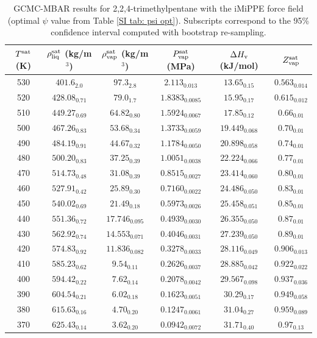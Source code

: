 \documentclass[journal=jctc,manuscript=article]{achemso}
\begin{document}
\begin{table}[htb!]
	\caption{GCMC-MBAR results for 2,2,4-trimethylpentane with the iMiPPE force field (optimal $\psi$ value from Table \ref{SI tab: psi opt}). Subscripts correspond to the 95\% confidence interval computed with bootstrap re-sampling.}
	\begin{center}
		\begin{tabular}{|c|c|c|c|c|c|}
			\hline
			$T^{\rm sat}$ (K) & $\rho_{\rm liq}^{\rm sat}$ (kg/m$^3$) & $\rho_{\rm vap}^{\rm sat}$ (kg/m$^3$) & $P_{\rm vap}^{\rm sat}$ (MPa) & $\Delta H_{\rm v}$ (kJ/mol) & $Z_{\rm vap}^{\rm sat}$ \\ \hline
			530 & $401.6_{2.0}$ & $97.3_{2.8}$ & $2.113_{0.013}$ & $13.65_{0.15}$ & $0.563_{0.014}$ \\
			520 & $428.08_{0.71}$ & $79.0_{1.7}$ & $1.8383_{0.0085}$ & $15.95_{0.17}$ & $0.615_{0.012}$ \\
			510 & $449.27_{0.69}$ & $64.82_{0.80}$ & $1.5924_{0.0067}$ & $17.85_{0.12}$ & $0.66_{0.01}$ \\
			500 & $467.26_{0.83}$ & $53.68_{0.34}$ & $1.3733_{0.0059}$ & $19.449_{0.068}$ & $0.70_{0.01}$ \\
			490 & $484.19_{0.91}$ & $44.67_{0.32}$ & $1.1784_{0.0050}$ & $20.898_{0.058}$ & $0.74_{0.01}$ \\
			480 & $500.20_{0.83}$ & $37.25_{0.39}$ & $1.0051_{0.0038}$ & $22.224_{0.066}$ & $0.77_{0.01}$ \\
			470 & $514.73_{0.48}$ & $31.08_{0.39}$ & $0.8515_{0.0027}$ & $23.414_{0.060}$ & $0.80_{0.01}$ \\
			460 & $527.91_{0.42}$ & $25.89_{0.30}$ & $0.7160_{0.0022}$ & $24.486_{0.050}$ & $0.83_{0.01}$ \\
			450 & $540.02_{0.69}$ & $21.49_{0.18}$ & $0.5973_{0.0026}$ & $25.458_{0.051}$ & $0.85_{0.01}$ \\
			440 & $551.36_{0.72}$ & $17.746_{0.095}$ & $0.4939_{0.0030}$ & $26.355_{0.050}$ & $0.87_{0.01}$ \\
			430 & $562.92_{0.74}$ & $14.553_{0.071}$ & $0.4046_{0.0031}$ & $27.239_{0.050}$ & $0.89_{0.01}$ \\
			420 & $574.83_{0.92}$ & $11.836_{0.082}$ & $0.3278_{0.0033}$ & $28.116_{0.049}$ & $0.906_{0.013}$ \\
			410 & $585.23_{0.62}$ & $9.54_{0.11}$ & $0.2626_{0.0037}$ & $28.885_{0.042}$ & $0.922_{0.022}$ \\
			400 & $594.42_{0.22}$ & $7.62_{0.14}$ & $0.2078_{0.0042}$ & $29.567_{0.098}$ & $0.937_{0.036}$ \\
			390 & $604.54_{0.21}$ & $6.02_{0.18}$ & $0.1623_{0.0051}$ & $30.29_{0.17}$ & $0.949_{0.058}$ \\
			380 & $615.63_{0.16}$ & $4.70_{0.20}$ & $0.1247_{0.0061}$ & $31.04_{0.27}$ & $0.959_{0.089}$ \\
			370 & $625.43_{0.14}$ & $3.62_{0.20}$ & $0.0942_{0.0072}$ & $31.71_{0.40}$ & $0.97_{0.13}$ \\
			\hline
		\end{tabular}
	\end{center}
\end{table}
\end{document}
